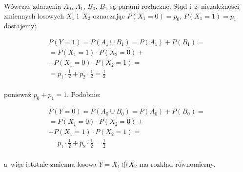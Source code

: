 \documentclass[a4paper,10pt, twocolumn]{article}
\begin{document}
\noindent Wówczas zdarzenia $A_{0}$, $A_{1}$, $B_{0}$, $B_{1}$ są parami rozłączne. Stąd i~z~niezależności zmiennych losowych $X_{1}$ i~$X_{2}$ oznaczając $P(X_{1} = 0) = p_{0}$, $P(X_{1} = 1) = p_{1}$ dostajemy:

\begin{equation*}
	\begin{array}{c} P(Y = 1) = P(A_{1} \cup B_{1}) = P(A_{1}) + P(B_{1}) = \\ = P(X_{1} = 1) \cdot P(X_{2} = 0) + \\ + P(X_{1} = 0) \cdot P(X_{2} = 1) = \\ = p_{1} \cdot \frac{1}{2} + p_{2} \cdot \frac{1}{2} = \frac{1}{2} \\ \end{array}
\end{equation*}

\noindent ponieważ $p_{0} + p_{1} = 1$. Podobnie:

\begin{equation*}
	\begin{array}{c} P(Y = 0) = P(A_{0} \cup B_{0}) = P(A_{0}) + P(B_{0}) = \\ = P(X_{1} = 0) \cdot P(X_{2} = 0) + \\ + P(X_{1} = 1) \cdot P(X_{2} = 1) = \\ = p_{1} \cdot \frac{1}{2} + p_{2} \cdot \frac{1}{2} = \frac{1}{2} \\ \end{array}
\end{equation*}

\noindent a~więc istotnie zmienna losowa $Y = X_{1} \oplus X_{2}$ ma rozkład równomierny.
\end{document}
